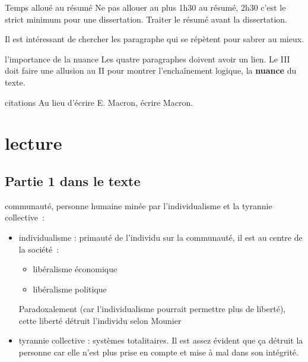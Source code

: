 \begin{remarque}{2}{Temps alloué au résumé}
    Ne pas allouer au plus 1h30 au résumé, 2h30 c'est le strict minimum pour une dissertation. Traiter le résumé avant la dissertation.
\end{remarque}

\begin{remarque}{3}{}
    Il est intéressant de chercher les paragraphe qui se répètent pour sabrer au mieux.
\end{remarque}


\begin{remarque}{4}{l'importance de la nuance}
    Les quatre paragraphes doivent avoir un lien. Le III doit faire une allusion au II pour montrer l'enchaînement logique, la \textbf{nuance} du texte.
\end{remarque}

\begin{remarque}{5}{citations}
    Au lieu d'écrire E. Macron, écrire Macron.
\end{remarque}

\section{lecture}
\subsection{Partie 1 dans le texte}
communauté, personne humaine minée par l'individualisme et la tyrannie collective~:
\begin{itemize}
    \item individualisme : primauté de l'individu sur la communauté, il est au centre de la société~:
    \begin{itemize}
        \item libéralisme économique
        \item libéralisme politique
    \end{itemize}
    Paradoxalement (car l'individualisme pourrait permettre plus de liberté), cette liberté détruit l'individu selon Mounier
    \item tyrannie collective : systèmes totalitaires. Il est assez évident que ça détruit la personne car elle n'est plus prise en compte et mise à mal dans son intégrité.
\end{itemize}

